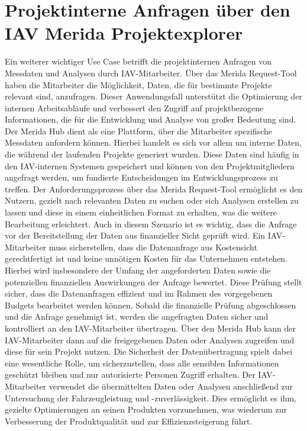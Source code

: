 \section{Projektinterne Anfragen über den IAV Merida Projektexplorer}
Ein weiterer wichtiger Use Case betrifft die projektinternen Anfragen von Messdaten und Analysen durch IAV-Mitarbeiter. Über das Merida Request-Tool haben die Mitarbeiter die Möglichkeit, Daten, die für bestimmte Projekte relevant sind, anzufragen. Dieser Anwendungsfall unterstützt die Optimierung der internen Arbeitsabläufe und verbessert den Zugriff auf projektbezogene Informationen, die für die Entwicklung und Analyse von großer Bedeutung sind.
\newline
Der Merida Hub dient als eine Plattform, über die Mitarbeiter spezifische Messdaten anfordern können. Hierbei handelt es sich vor allem um interne Daten, die während der laufenden Projekte generiert wurden. Diese Daten sind häufig in den IAV-internen Systemen gespeichert und können von den Projektmitgliedern angefragt werden, um fundierte Entscheidungen im Entwicklungsprozess zu treffen. Der Anforderungsprozess über das Merida Request-Tool ermöglicht es den Nutzern, gezielt nach relevanten Daten zu suchen oder sich Analysen erstellen zu lassen und diese in einem einheitlichen Format zu erhalten, was die weitere Bearbeitung erleichtert.
\newline
Auch in diesem Szenario ist es wichtig, dass die Anfrage vor der Bereitstellung der Daten aus finanzieller Sicht geprüft wird. Ein IAV-Mitarbeiter muss sicherstellen, dass die Datenanfrage aus Kostensicht gerechtfertigt ist und keine unnötigen Kosten für das Unternehmen entstehen. Hierbei wird insbesondere der Umfang der angeforderten Daten sowie die potenziellen finanziellen Auswirkungen der Anfrage bewertet. Diese Prüfung stellt sicher, dass die Datenanfragen effizient und im Rahmen des vorgegebenen Budgets bearbeitet werden können.
\newline
Sobald die finanzielle Prüfung abgeschlossen und die Anfrage genehmigt ist, werden die angefragten Daten sicher und kontrolliert an den IAV-Mitarbeiter übertragen. Über den Merida Hub kann der IAV-Mitarbeiter dann auf die freigegebenen Daten oder Analysen zugreifen und diese für sein Projekt nutzen. Die Sicherheit der Datenübertragung spielt dabei eine wesentliche Rolle, um sicherzustellen, dass alle sensiblen Informationen geschützt bleiben und nur autorisierte Personen Zugriff erhalten.
\newline
Der IAV-Mitarbeiter verwendet die übermittelten Daten oder Analysen anschließend zur Untersuchung der Fahrzeugleistung und -zuverlässigkeit. Dies ermöglicht es ihm, gezielte Optimierungen an seinen Produkten vorzunehmen, was wiederum zur Verbesserung der Produktqualität und zur Effizienzsteigerung führt.
